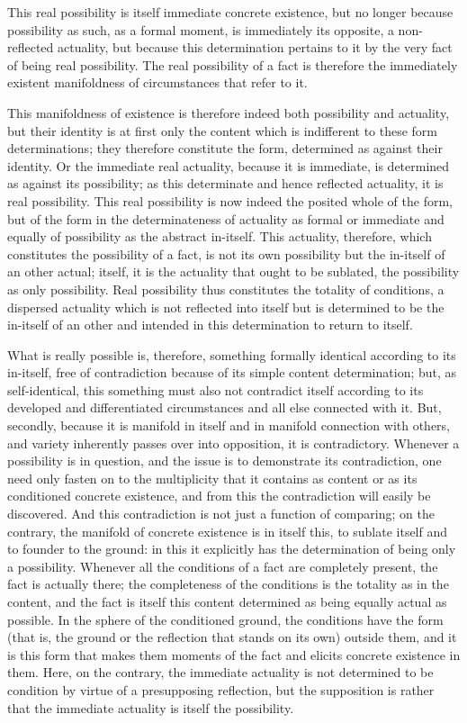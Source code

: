 This real possibility is itself immediate concrete existence,
but no longer because possibility as such, as a formal moment,
is immediately its opposite, a non-reflected actuality,
but because this determination pertains to it
by the very fact of being real possibility.
The real possibility of a fact is therefore
the immediately existent manifoldness of
circumstances that refer to it.

This manifoldness of existence is therefore indeed
both possibility and actuality,
but their identity is at first only the content
which is indifferent to these form determinations;
they therefore constitute the form,
determined as against their identity.
Or the immediate real actuality, because it is immediate,
is determined as against its possibility;
as this determinate and hence reflected actuality,
it is real possibility.
This real possibility is now indeed the posited whole of the form,
but of the form in the determinateness of actuality as formal
or immediate and equally of possibility as the abstract in-itself.
This actuality, therefore, which constitutes the possibility of a fact,
is not its own possibility but the in-itself of an other actual;
itself, it is the actuality that ought to be sublated,
the possibility as only possibility.
Real possibility thus constitutes the totality of conditions,
a dispersed actuality which is not reflected into itself
but is determined to be the in-itself of an other
and intended in this determination to return to itself.

What is really possible is, therefore,
something formally identical according to its in-itself,
free of contradiction because of its simple content determination;
but, as self-identical, this something must also not contradict
itself according to its developed and differentiated circumstances
and all else connected with it.
But, secondly, because it is manifold in itself
and in manifold connection with others,
and variety inherently passes over into opposition,
it is contradictory.
Whenever a possibility is in question,
and the issue is to demonstrate its contradiction,
one need only fasten on to the multiplicity that it contains as content
or as its conditioned concrete existence,
and from this the contradiction will easily be discovered.
And this contradiction is not just a function of comparing;
on the contrary, the manifold of concrete existence is in itself this,
to sublate itself and to founder to the ground:
in this it explicitly has the determination of
being only a possibility.
Whenever all the conditions of a fact are completely present,
the fact is actually there;
the completeness of the conditions is
the totality as in the content,
and the fact is itself this content determined
as being equally actual as possible.
In the sphere of the conditioned ground,
the conditions have the form
(that is, the ground or the reflection that stands on its own)
outside them,
and it is this form that makes them moments
of the fact and elicits concrete existence in them.
Here, on the contrary, the immediate actuality is
not determined to be condition by virtue of
a presupposing reflection,
but the supposition is rather that the immediate actuality is
itself the possibility.

